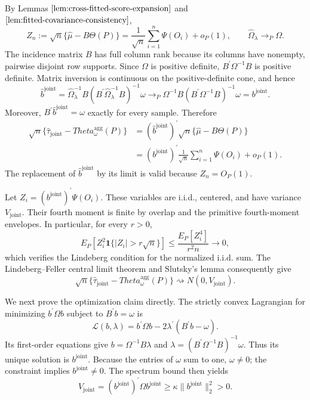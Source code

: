 By Lemmas \(\ref{lem:cross-fitted-score-expansion}\) and \(\ref{lem:fitted-covariance-consistency}\),
\[
 Z_n:=\sqrt n\{\widehat\mu-B\Theta(P)\}
 =\frac1{\sqrt n}\sum_{i=1}^n\Psi(O_i)+o_P(1),
 \qquad
 \widehat\Omega_\lambda\to_P\Omega.
\]
The incidence matrix \(B\) has full column rank because its columns have nonempty, pairwise disjoint row supports.  Since \(\Omega\) is positive definite, \(B^{\prime}\Omega^{-1}B\) is positive definite.  Matrix inversion is continuous on the positive-definite cone, and hence
\[
 \widehat b^{\mathrm{joint}}
 =\widehat\Omega_\lambda^{-1}B
 (B^{\prime}\widehat\Omega_\lambda^{-1}B)^{-1}\omega
 \to_P
 \Omega^{-1}B(B^{\prime}\Omega^{-1}B)^{-1}\omega
 =b^{\mathrm{joint}}.
\]
Moreover, \(B^{\prime}\widehat b^{\mathrm{joint}}=\omega\) exactly for every sample.  Therefore
\[
\begin{aligned}
 \sqrt n\{\widehat\tau_{\mathrm{joint}}-Theta_\omega^{\mathrm{agg}}(P)\}
 &=(\widehat b^{\mathrm{joint}})^{\prime}
   \sqrt n\{\widehat\mu-B\Theta(P)\}\\
 &=(b^{\mathrm{joint}})^{\prime}
   \frac1{\sqrt n}\sum_{i=1}^n\Psi(O_i)+o_P(1).
\end{aligned}
\]
The replacement of \(\widehat b^{\mathrm{joint}}\) by its limit is valid because \(Z_n=O_P(1)\).

Let \(Z_i=(b^{\mathrm{joint}})^{\prime}\Psi(O_i)\).  These variables are i.i.d., centered, and have variance \(V_{\mathrm{joint}}\).  Their fourth moment is finite by overlap and the primitive fourth-moment envelopes.  In particular, for every \(r>0\),
\[
 E_P\left[Z_i^2\mathbf 1\{|Z_i|>r\sqrt n\}\right]
 \le \frac{E_P[Z_i^4]}{r^2n}\longrightarrow0,
\]
which verifies the Lindeberg condition for the normalized i.i.d. sum.  The Lindeberg--Feller central limit theorem and Slutsky's lemma consequently give
\[
 \sqrt n\{\widehat\tau_{\mathrm{joint}}-Theta_\omega^{\mathrm{agg}}(P)\}
 \rightsquigarrow N(0,V_{\mathrm{joint}}).
\]

We next prove the optimization claim directly.  The strictly convex Lagrangian for minimizing \(b^{\prime}\Omega b\) subject to \(B^{\prime}b=\omega\) is
\[
 \mathcal L(b,\lambda)=b^{\prime}\Omega b-2\lambda^{\prime}(B^{\prime}b-\omega).
\]
Its first-order equations give \(b=\Omega^{-1}B\lambda\) and
\(\lambda=(B^{\prime}\Omega^{-1}B)^{-1}\omega\).  Thus its unique solution is \(b^{\mathrm{joint}}\).  Because the entries of \(\omega\) sum to one, \(\omega\ne0\); the constraint implies \(b^{\mathrm{joint}}\ne0\).  The spectrum bound then yields
\[
 V_{\mathrm{joint}}
 =(b^{\mathrm{joint}})^{\prime}\Omega b^{\mathrm{joint}}
 \ge\kappa\|b^{\mathrm{joint}}\|_2^2>0.
\]

